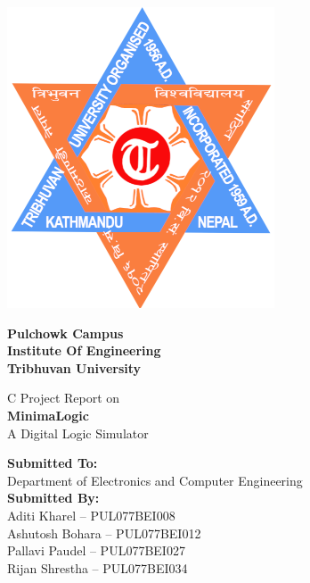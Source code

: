 \documentclass[main.tex]{subfiles}
\begin{document}
    \begin{titlepage}
        \begin{center}
            \includegraphics[width=0.22\linewidth]{graphics/TU-logo.png}\\[0.5cm]
            \begin{large}
                \textbf{Pulchowk Campus\\
                Institute Of Engineering\\
                Tribhuvan University\\[3cm]}
            \end{large}
            \large{C Project Report on\\}
            \Huge{\textbf{MinimaLogic}\\}
            \large{A Digital Logic Simulator\\[2cm]}
            \begin{large}
                \textbf{Submitted To:}\\
                {\Large Department of Electronics and Computer Engineering\\[1cm]}
                \textbf{Submitted By:}\\
                Aditi Kharel – PUL077BEI008\\
                Ashutosh Bohara – PUL077BEI012\\
                Pallavi Paudel – PUL077BEI027\\
                Rijan Shrestha – PUL077BEI034\\
            \end{large}
        \end{center}
    \end{titlepage}
\end{document}
